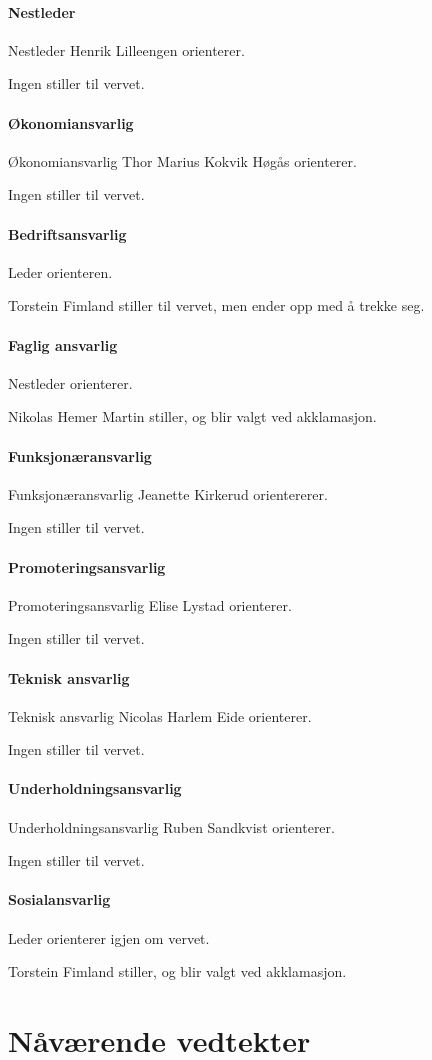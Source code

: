 \documentclass[10pt,norsk,a4paper]{article}
\begin{document}
\subsection{Nestleder}
Nestleder Henrik Lilleengen orienterer.

Ingen stiller til vervet.

\subsection{Økonomiansvarlig}
Økonomiansvarlig Thor Marius Kokvik Høgås orienterer.

Ingen stiller til vervet.

\subsection{Bedriftsansvarlig}
Leder orienteren.

Torstein Fimland stiller til vervet, men ender opp med å trekke seg.

\subsection{Faglig ansvarlig}
Nestleder orienterer.

Nikolas Hemer Martin stiller, og blir valgt ved akklamasjon.

\subsection{Funksjonæransvarlig}
Funksjonæransvarlig Jeanette Kirkerud orientererer.

Ingen stiller til vervet.

\subsection{Promoteringsansvarlig}
Promoteringsansvarlig Elise Lystad orienterer.

Ingen stiller til vervet.

\subsection{Teknisk ansvarlig}
Teknisk ansvarlig Nicolas Harlem Eide orienterer.

Ingen stiller til vervet.

\subsection{Underholdningsansvarlig}
Underholdningsansvarlig Ruben Sandkvist orienterer.

Ingen stiller til vervet.

\subsection{Sosialansvarlig}
Leder orienterer igjen om vervet.

Torstein Fimland stiller, og blir valgt ved akklamasjon.\label{lastpage}

\newpage
\part{Nåværende vedtekter}

\end{document}

